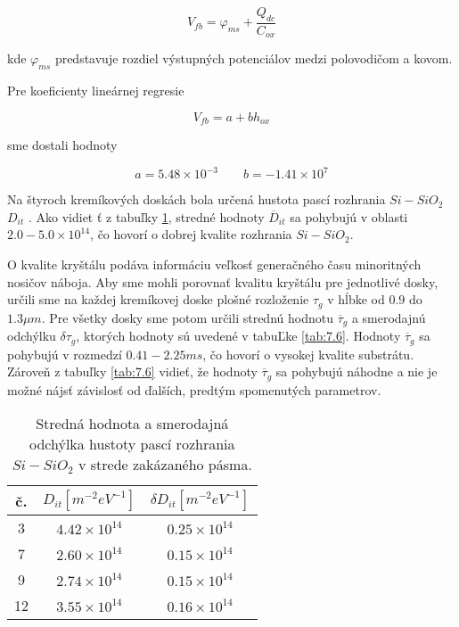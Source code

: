\begin{equation}\label{eq:7.3}
V_{fb}  = \varphi_{ms} + \frac{Q_{dc}}{C_{ox}}
\end{equation}

kde $\varphi_{ms}$ predstavuje rozdiel výstupných potenciálov medzi
polovodičom a kovom.

Pre koeficienty lineárnej regresie 

$$V_{fb}  = a + b h_{ox}$$                        

sme dostali hodnoty 

$$a = 5.48 \times 10^{-3}  \qquad  b = -1.41 \times 10^{7}$$

Na štyroch kremíkových doskách bola určená hustota pascí rozhrania
$Si-SiO_2$ $D_{it}$ . Ako vidiet ť z tabuľky \ref{tab:7.5}, stredné
hodnoty $\overline D_{it}$ sa pohybujú v oblasti $2.0-5.0\times
10^{14}$, čo hovorí o dobrej kvalite rozhrania $Si-SiO_{2}$.

O kvalite kryštálu podáva informáciu veľkosť generačného času
minoritných nosičov náboja. Aby sme mohli porovnať kvalitu kryštálu
pre jednotlivé dosky, určili sme na každej kremíkovej doske plošné
rozloženie $\tau_{g}$ v hĺbke od $0.9$ do $1.3\mu m$. Pre všetky dosky
sme potom určili strednú hodnotu $\overline\tau_{g}$ a smerodajnú
odchýlku $\delta\tau_{g}$, ktorých hodnoty sú uvedené v tabuĽke
\ref{tab:7.6}. Hodnoty $\overline\tau_{g}$ sa pohybujú v rozmedzí
$0.41 - 2.25 ms$, čo hovorí o vysokej kvalite substrátu. Zároveň z
tabuľky \ref{tab:7.6} vidieť, že hodnoty $\overline \tau_{g}$ sa
pohybujú náhodne a nie je možné nájsť závislosť od ďalších, predtým
spomenutých parametrov.

\begin{table}[h!]\centering
\begin{tabular}{|c|c|c|}
\hline
č. & $D_{it}[m^{-2}eV^{-1}]$ & $\delta D_{it}[m^{-2}eV^{-1}]$ \\ 
\hline
 3 & $4.42 \times 10^{14}$ & $0.25 \times 10^{14}$ \\
 7 & $2.60 \times 10^{14}$ & $0.15 \times 10^{14}$ \\
 9 & $2.74 \times 10^{14}$ & $0.15 \times 10^{14}$ \\
12 & $3.55 \times 10^{14}$ & $0.16 \times 10^{14}$ \\
\hline
\end{tabular}
\captionsetup{justification=raggedright, singlelinecheck=false}
\caption [Stredná hodnota a smerodajná odchýlka hustoty pascí
  rozhrania $Si-SiO_{2}$ v strede zakázaného pásma.] {Stredná hodnota
  a smerodajná odchýlka hustoty pascí rozhrania $Si-SiO_{2}$ v strede
  zakázaného pásma.}
\label{tab:7.5}
\end{table}

